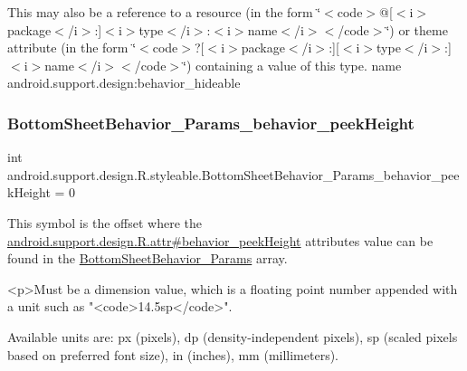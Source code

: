 This may also be a reference to a resource (in the form \char`\"{}$<$code$>$@\mbox{[}$<$i$>$package$<$/i$>$\+:\mbox{]}$<$i$>$type$<$/i$>$\+:$<$i$>$name$<$/i$>$$<$/code$>$\char`\"{}) or theme attribute (in the form \char`\"{}$<$code$>$?\mbox{[}$<$i$>$package$<$/i$>$\+:\mbox{]}\mbox{[}$<$i$>$type$<$/i$>$\+:\mbox{]}$<$i$>$name$<$/i$>$$<$/code$>$\char`\"{}) containing a value of this type.  name android.\+support.\+design\+:behavior\+\_\+hideable \mbox{\label{classandroid_1_1support_1_1design_1_1R_1_1styleable_a32c296d23574cb4ecb2698c4645bbbd9}} 
\subsubsection{\texorpdfstring{Bottom\+Sheet\+Behavior\+\_\+\+Params\+\_\+behavior\+\_\+peek\+Height}{BottomSheetBehavior\_Params\_behavior\_peekHeight}}
{\footnotesize\ttfamily int android.\+support.\+design.\+R.\+styleable.\+Bottom\+Sheet\+Behavior\+\_\+\+Params\+\_\+behavior\+\_\+peek\+Height = 0\hspace{0.3cm}{\ttfamily [static]}}

This symbol is the offset where the \hyperlink{classandroid_1_1support_1_1design_1_1R_1_1attr_ac53824c6ca9d593963ac006a84e4d4b3}{android.\+support.\+design.\+R.\+attr\#behavior\+\_\+peek\+Height} attribute\textquotesingle{}s value can be found in the \hyperlink{classandroid_1_1support_1_1design_1_1R_1_1styleable_a1eaee76086f549bf3ccdc756b449ddd4}{Bottom\+Sheet\+Behavior\+\_\+\+Params} array.

\begin{DoxyVerb}      <p>Must be a dimension value, which is a floating point number appended with a unit such as "<code>14.5sp</code>".
\end{DoxyVerb}
 Available units are\+: px (pixels), dp (density-\/independent pixels), sp (scaled pixels based on preferred font size), in (inches), mm (millimeters). 

